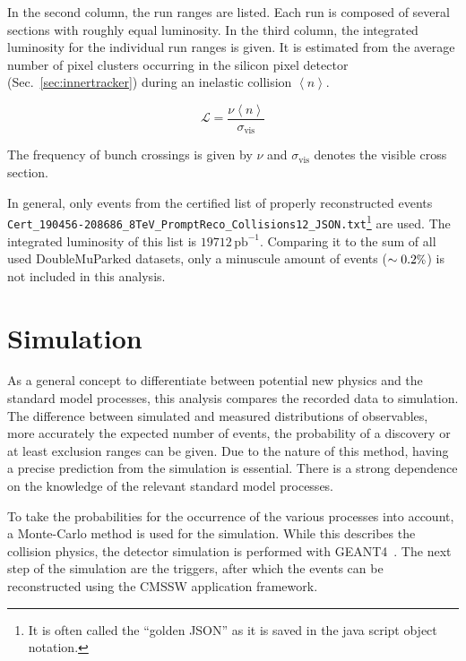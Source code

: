 In the second column, the run ranges are listed. Each run is composed of several sections with roughly equal luminosity. In the third column, the integrated luminosity for the individual run ranges is given. It is estimated from the average number of pixel clusters occurring in the silicon pixel detector (Sec.~\ref{sec:innertracker}) during an inelastic collision $\left< n \right>$.

\begin{equation}
  \label{eq:lumi}
  \mathcal{L} = \frac{\nu \left< n \right>}{\sigma_{\text{vis}}}
\end{equation}

\noindent The frequency of bunch crossings is given by $\nu$ and $\sigma_{\text{vis}}$ denotes the visible cross section. 

In general, only events from the certified list of properly reconstructed events \\ \verb+Cert_190456-208686_8TeV_PromptReco_Collisions12_JSON.txt+\footnote{It is often called the ``golden JSON'' as it is saved in the java script object notation.} are used. The integrated luminosity of this list is $19712\,\text{pb}^{-1}$. Comparing it to the sum of all used DoubleMuParked datasets, only a minuscule amount of events ($\sim 0.2\pct$) is not included in this analysis.

\section{Simulation}

As a general concept to differentiate between potential new physics and the standard model processes, this analysis compares the recorded data to simulation. The difference between simulated and measured distributions of observables, more accurately the expected number of events, the probability of a discovery or at least exclusion ranges can be given. Due to the nature of this method, having a precise prediction from the simulation is essential. There is a strong dependence on the knowledge of the relevant standard model processes.

To take the probabilities for the occurrence of the various processes into account, a Monte-Carlo method is used for the simulation. While this describes the collision physics, the detector simulation is performed with \textsc{GEANT4}~\cite{geant41,geant42}. The next step of the simulation are the triggers, after which the events can be reconstructed using the \textsc{CMSSW} application framework.

